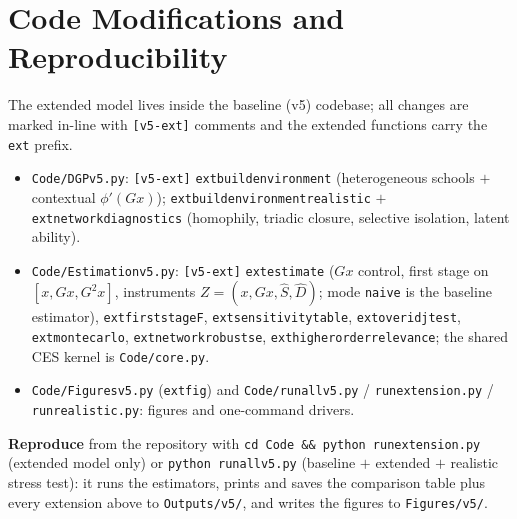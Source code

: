 \documentclass[11pt]{article}
\renewcommand{\_}{\textunderscore\allowbreak}
\begin{document}
\section{Code Modifications and Reproducibility}
The extended model lives inside the baseline (v5) codebase; all changes are marked in-line with \texttt{[v5-ext]} comments and the extended functions carry the \texttt{ext\_} prefix.
\begin{itemize}[leftmargin=1.4em,itemsep=1pt,topsep=2pt]
\item \texttt{Code/DGP\_v5.py}: \texttt{[v5-ext]} \texttt{ext\_build\_environment} (heterogeneous schools $+$ contextual $\phi'(Gx)$); \texttt{ext\_build\_environment\_realistic} $+$ \texttt{ext\_network\_diagnostics} (homophily, triadic closure, selective isolation, latent ability).
\item \texttt{Code/Estimation\_v5.py}: \texttt{[v5-ext]} \texttt{ext\_estimate} ($Gx$ control, first stage on $[x,Gx,G^2x]$, instruments $Z=(x,Gx,\widehat S,\widehat D)$; mode \texttt{naive} is the baseline estimator), \texttt{ext\_first\_stage\_F}, \texttt{ext\_sensitivity\_table}, \texttt{ext\_overid\_j\_test}, \texttt{ext\_monte\_carlo}, \texttt{ext\_network\_robust\_se}, \texttt{ext\_higher\_order\_relevance}; the shared CES kernel is \texttt{Code/core.py}.
\item \texttt{Code/Figures\_v5.py} (\texttt{ext\_fig\_*}) and \texttt{Code/run\_all\_v5.py} / \texttt{run\_extension.py} / \texttt{run\_realistic.py}: figures and one-command drivers.
\end{itemize}
\textbf{Reproduce} from the repository with \texttt{cd Code \&\& python run\_extension.py} (extended model only) or \texttt{python run\_all\_v5.py} (baseline $+$ extended $+$ realistic stress test): it runs the estimators, prints and saves the comparison table plus every extension above to \texttt{Outputs/v5/}, and writes the figures to \texttt{Figures/v5/}.
\end{document}
